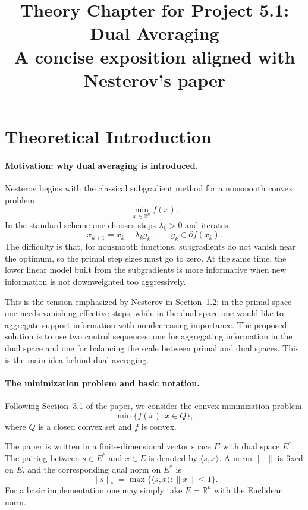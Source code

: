 \documentclass[12pt,a4paper]{article}
\title{Theory Chapter for Project 5.1: Dual Averaging \\ \large A concise exposition aligned with Nesterov's paper}
\author{}
\date{}
\begin{document}
\maketitle

\section{Theoretical Introduction}
\paragraph{Motivation: why dual averaging is introduced.}
Nesterov begins with the classical subgradient method for a nonsmooth convex problem
\begin{equation}
    \min_{x \in \mathbb{R}^n} f(x).
\end{equation}
In the standard scheme one chooses steps $\lambda_k > 0$ and iterates
\begin{equation}
    x_{k+1} = x_k - \lambda_k g_k, \qquad g_k \in \partial f(x_k).
\end{equation}
The difficulty is that, for nonsmooth functions, subgradients do not vanish near the optimum, so the primal step sizes must go to zero. At the same time, the lower linear model built from the subgradients is more informative when new information is not downweighted too aggressively.

This is the tension emphasized by Nesterov in Section~1.2: in the primal space one needs vanishing effective steps, while in the dual space one would like to aggregate support information with nondecreasing importance. The proposed solution is to use two control sequences: one for aggregating information in the dual space and one for balancing the scale between primal and dual spaces. This is the main idea behind dual averaging.

\paragraph{The minimization problem and basic notation.}
Following Section~3.1 of the paper, we consider the convex minimization problem
\begin{equation}
    \min \{ f(x) : x \in Q \},
    \label{eq:main-problem}
\end{equation}
where $Q$ is a closed convex set and $f$ is convex.

The paper is written in a finite-dimensional vector space $E$ with dual space $E^*$. The pairing between $s \in E^*$ and $x \in E$ is denoted by $\langle s,x \rangle$. A norm $\|\cdot\|$ is fixed on $E$, and the corresponding dual norm on $E^*$ is
\begin{equation}
    \|s\|_* = \max\{ \langle s,x \rangle : \|x\| \le 1 \}.
\end{equation}
For a basic implementation one may simply take $E = \mathbb{R}^n$ with the Euclidean norm.
\end{document}
